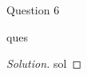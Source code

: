 \begin{solution}{Question 6}\label{ques:6}
    \begin{question}
        ques
    \end{question}
    \tcblower{}
    \begin{proof}[Solution]
        sol
    \end{proof}
\end{solution}
